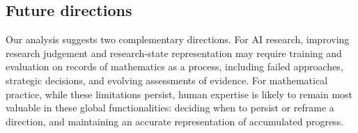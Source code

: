 \subsection{Future directions}
Our analysis suggests two complementary directions. For AI research, improving research judgement and research-state representation may require training and evaluation on records of mathematics as a process, including failed approaches, strategic decisions, and evolving assessments of evidence. For mathematical practice, while these limitations persist, human expertise is likely to remain most valuable in these global functionalities: deciding when to persist or reframe a direction, and maintaining an accurate representation of accumulated progress.















